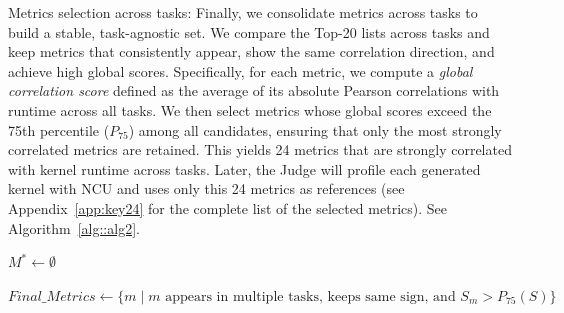  {\sf Metrics selection across tasks}: Finally, we consolidate metrics across tasks to build a stable, task-agnostic set. We compare the Top-20 lists across tasks and keep metrics that consistently appear, show the same correlation direction, and achieve high global scores. Specifically, for each metric, we compute a {\it global correlation score} defined as the average of its absolute Pearson correlations with runtime across all tasks. We then select metrics whose global scores exceed the 75th percentile ($P_{75}$) among all candidates, ensuring that only the most strongly correlated metrics are retained. This yields 24 metrics that are strongly correlated with kernel runtime across tasks. Later, the Judge will profile each generated kernel with NCU and uses only this 24 metrics as references (see Appendix~\ref{app:key24} for the complete list of the selected metrics).  See Algorithm~\ref{alg::alg2}. 


\begin{algorithm}[H]
\caption{Step 2-3: Profiling and Metrics Selection}\label{alg::alg2}

$M^* \gets \emptyset$\;


$Final\_Metrics \gets \{m \mid m \text{ appears in multiple tasks, keeps same sign, and } S_m > P_{75}(S)\}$\;



\end{algorithm}



